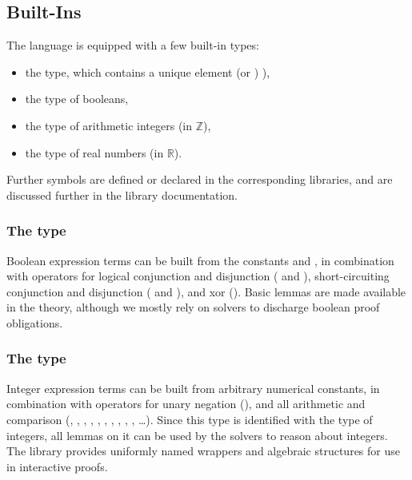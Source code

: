 \subsection{Built-Ins}
The language is equipped with a few built-in types:
\begin{itemize}\itemsep-.5em
\item the  type, which
        contains a unique element
         (or \rawec{()}) %
),
\item the  type of booleans,
\item the  type of arithmetic integers (in $\mathbb{Z}$),
\item the  type of real numbers (in $\mathbb{R}$).
\end{itemize}

Further symbols are defined or declared in the corresponding libraries, and are
discussed further in the library documentation.

\subsubsection*{The  type}
Boolean expression terms can be built from the constants
 and
, in combination
with operators for logical conjunction and disjunction
(\rawec{/\\} and
\rawec{\\\/}),
short-circuiting conjunction and disjunction
(\rawec{\&\&}
and
\rawec{||}),
and xor
(\rawec{\^\^}).
Basic lemmas are made available in the  theory, although we mostly
rely on \SMT solvers to discharge boolean proof obligations.

\subsubsection*{The  type}
Integer expression terms can be built from arbitrary numerical constants, in
combination with operators for unary negation (\rawec{-}), and all arithmetic
and comparison (\rawec{+}, \rawec{-}, \rawec{*}, \rawec{/}, \rawec{\%},
\rawec{^}, \rawec{=}, \rawec{<}, \rawec{<=}, \rawec{>}, \rawec{>=} \ldots).
Since this type is identified with the \WhyThree type of integers, all \WhyThree
lemmas on it can be used by the \SMT solvers to reason about integers. The
 library provides uniformly named wrappers and algebraic structures
for use in interactive proofs.

